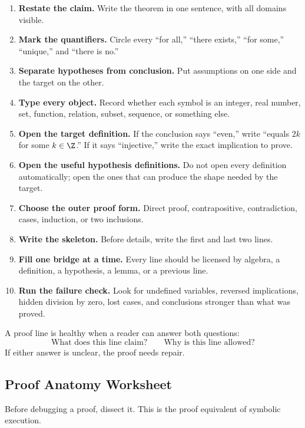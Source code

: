 \begin{enumerate}
\item \textbf{Restate the claim.} Write the theorem in one sentence, with all domains visible.
\item \textbf{Mark the quantifiers.} Circle every ``for all,'' ``there exists,'' ``for some,'' ``unique,'' and ``there is no.''
\item \textbf{Separate hypotheses from conclusion.} Put assumptions on one side and the target on the other.
\item \textbf{Type every object.} Record whether each symbol is an integer, real number, set, function, relation, subset, sequence, or something else.
\item \textbf{Open the target definition.} If the conclusion says ``even,'' write ``equals $2k$ for some $k\in\Z$.'' If it says ``injective,'' write the exact implication to prove.
\item \textbf{Open the useful hypothesis definitions.} Do not open every definition automatically; open the ones that can produce the shape needed by the target.
\item \textbf{Choose the outer proof form.} Direct proof, contrapositive, contradiction, cases, induction, or two inclusions.
\item \textbf{Write the skeleton.} Before details, write the first and last two lines.
\item \textbf{Fill one bridge at a time.} Every line should be licensed by algebra, a definition, a hypothesis, a lemma, or a previous line.
\item \textbf{Run the failure check.} Look for undefined variables, reversed implications, hidden division by zero, lost cases, and conclusions stronger than what was proved.
\end{enumerate}

\begin{formalbox}
A proof line is healthy when a reader can answer both questions:
\[
\text{What does this line claim?}
\qquad
\text{Why is this line allowed?}
\]
If either answer is unclear, the proof needs repair.
\end{formalbox}

\subsection{Proof Anatomy Worksheet}

Before debugging a proof, dissect it. This is the proof equivalent of symbolic execution.

